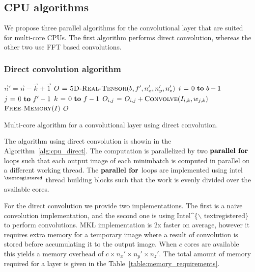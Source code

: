 \documentclass[conference]{IEEEtran}
\begin{document}
\subsection{CPU algorithms}

  We propose three parallel algorithms for the convolutional layer
  that are suited for multi-core CPUs.  The first algorithm performs
  direct convolution, whereas the other two use FFT based
  convolutions.

\subsubsection{Direct convolution algorithm}

  \begin{algorithm}
    {\small
      \begin{codebox}
        \li $\vec{n}' = \vec{n} - \vec{k} + \vec{1}$
        \li $O \mathrel{\hspace{1pt}=\hspace{1pt}} \textnormal{\scshape5D-Real-Tensor}(b,f',n'_x,n'_y,n'_z)$
        \li {} $i \gets 0 \To b-1$
        \li   \Do {} $j \gets 0 \To f'-1$
        \li     \Do \For $k \gets 0 \To f-1$
        \li     \Do $O_{i,j} \mathrel{\hspace{1pt}=\hspace{1pt}} O_{i,j} + \textnormal{\scshape Convolve}(I_{i,k},w_{j,k})$
        \End \End \End
        \li $\textnormal{\scshape Free-Memory}(I)$
        \li \Return $O$
      \end{codebox}
    }

    \caption{Multi-core algorithm for a convolutional layer using direct
      convolution.}
    \label{alg:cpu_direct}
  \end{algorithm}

  The algorithm using direct convolution is showin in the
  Algorithm~\ref{alg:cpu_direct}.  The computation is parallelized by
  two $\textbf{parallel for}$ loops such that each output image of each
  minimbatch is computed in parallel on a different working thread.
  The $\textbf{parallel for}$ loops are implemented using intel$^{\small
    \textregistered}$ thread building blocks such that the work is
  evenly divided over the available cores.

  For the direct convolution we provide two implementations.  The
  first is a naive convolution implementation, and the second one is
  using Intel\^{}$\{$$\backslash$ textregistered$\}$ to perform
  convolutions.  MKL implementation is 2x faster on average, however
  it requires extra memory for a temporary image where a result of
  convolution is stored before accumulating it to the output image.
  When $c$ cores are available this yields a memory overhead of $c
  \times n_x' \times n_y' \times n_z'$.  The total amount of memory
  required for a layer is given in the
  Table~\ref{table:memory_requirements}.
\end{document}
